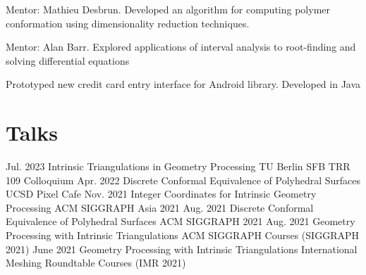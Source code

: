 \documentclass[11pt,letterpaper,sans]{moderncv}        %
\begin{document}
{Mentor: Mathieu Desbrun. Developed an algorithm for computing polymer conformation using dimensionality reduction techniques.
}

{Mentor: Alan Barr. Explored applications of interval analysis to root-finding and solving differential equations
}


{Prototyped new credit card entry interface for Android library. Developed in Java}

\section{Talks}
\cventry
{Jul. 2023}
{Intrinsic Triangulations in Geometry Processing}
{TU Berlin SFB TRR 109 Colloquium}{}{}
{}
\cventry
{Apr. 2022}
{Discrete Conformal Equivalence of Polyhedral Surfaces}
{UCSD Pixel Cafe}{}{}
{}
\cventry
{Nov. 2021}
{Integer Coordinates for Intrinsic Geometry Processing}
{ACM SIGGRAPH Asia 2021}{}{}
{}
\cventry
{Aug. 2021}
{Discrete Conformal Equivalence of Polyhedral Surfaces}
{ACM SIGGRAPH 2021}{}{}
{}
\cventry
{Aug. 2021}
{Geometry Processing with Intrinsic Triangulations}
{ACM SIGGRAPH Courses (SIGGRAPH 2021)}{}{}
{}
\cventry
{June 2021}
{Geometry Processing with Intrinsic Triangulations}
{International Meshing Roundtable Courses (IMR 2021)}{}{}
{}


\end{document}
